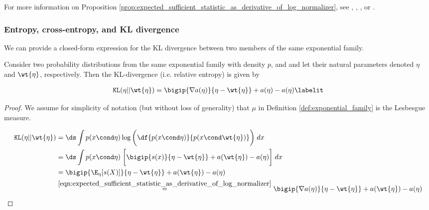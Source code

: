 \documentclass{article} %
\newcommand{\logNormalizerFunction}{a}
\newcommand{\sufficientStatsFunction}{s}
\begin{document}
For more information on Proposition \ref{prop:expected_sufficient_statistic_as_derivative_of_log_normalizer}, see \citet{jordan2010exponential}, \citet{jordan2010conjugate}, \citet{nielsen2010entropies}, or \citet{nielsen2009statistical}.   

\subsubsection{Entropy, cross-entropy, and KL divergence}

We can provide a closed-form expression for the KL divergence between two members of the same exponential family. 

\begin{proposition}
Consider two probability distributions from the same exponential family with density $p$, and and let their natural  parameters denoted $\eta$ and $\wt{\eta}$, respectively.  Then the KL-divergence (i.e. relative entropy) is given by

\begin{align*}
\texttt{KL}(\eta || \wt{\eta}) = \bigip{\nabla \logNormalizerFunction(\eta)}{\eta - \wt{\eta}} + \logNormalizerFunction(\eta) - \logNormalizerFunction(\eta) 
\labelit \label{eqn:KL_divergence_between_two_members_of_the_sample_exponential_family}
\end{align*}
 


\begin{proof}
We assume for simplicity of notation (but without loss of generality) that $\mu$ in Definition \ref{def:exponential_family} is the Lesbesgue measure. 

\begin{align*}
\texttt{KL}(\eta || \wt{\eta}) &= \ds\int p(x \cond \eta) \log \bigg( \df{p(x \cond \eta)}{p(x \cond \wt{\eta})}\bigg) \;dx \\ 
& = \ds\int p(x \cond \eta) \; \bigg[ \bigip{\sufficientStatsFunction(x)}{\eta - \wt{\eta}}  + \logNormalizerFunction(\wt{\eta}) - \logNormalizerFunction(\eta) \bigg] \; dx \\
&= \bigip{\E_{\eta}[\sufficientStatsFunction(X)]}{\eta - \wt{\eta} } + \logNormalizerFunction(\wt{\eta}) - \logNormalizerFunction(\eta) \\
& \stackrel{\eqref{eqn:expected_sufficient_statistic_as_derivative_of_log_normalizer}}{=}  \bigip{\nabla \logNormalizerFunction(\eta)}{\eta - \wt{\eta} } + \logNormalizerFunction(\wt{\eta}) - \logNormalizerFunction(\eta)
\end{align*}
	
\end{proof}
\label{prop:kl_divergence_between_members_of_same_exponential_family}
\end{proposition}
\end{document}
